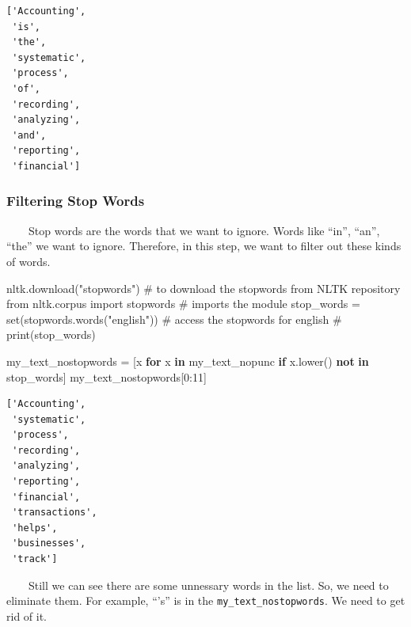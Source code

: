 \documentclass[
  letterpaper,
  DIV=11,
  numbers=noendperiod]{scrreprt}
\newenvironment{Shaded}{\begin{snugshade}}{\end{snugshade}}
\newcommand{\BuiltInTok}[1]{\textcolor[rgb]{0.00,0.23,0.31}{#1}}
\newcommand{\CommentTok}[1]{\textcolor[rgb]{0.37,0.37,0.37}{#1}}
\newcommand{\ControlFlowTok}[1]{\textcolor[rgb]{0.00,0.23,0.31}{\textbf{#1}}}
\newcommand{\DecValTok}[1]{\textcolor[rgb]{0.68,0.00,0.00}{#1}}
\newcommand{\ImportTok}[1]{\textcolor[rgb]{0.00,0.46,0.62}{#1}}
\newcommand{\KeywordTok}[1]{\textcolor[rgb]{0.00,0.23,0.31}{\textbf{#1}}}
\newcommand{\NormalTok}[1]{\textcolor[rgb]{0.00,0.23,0.31}{#1}}
\newcommand{\OperatorTok}[1]{\textcolor[rgb]{0.37,0.37,0.37}{#1}}
\newcommand{\StringTok}[1]{\textcolor[rgb]{0.13,0.47,0.30}{#1}}
\begin{document}
\begin{verbatim}
['Accounting',
 'is',
 'the',
 'systematic',
 'process',
 'of',
 'recording',
 'analyzing',
 'and',
 'reporting',
 'financial']
\end{verbatim}

\subsubsection{Filtering Stop Words}\label{filtering-stop-words}

~~~~Stop words are the words that we want to ignore. Words like ``in'',
``an'', ``the'' we want to ignore. Therefore, in this step, we want to
filter out these kinds of words.

\begin{Shaded}
\begin{Highlighting}[]
\NormalTok{nltk.download(}\StringTok{"stopwords"}\NormalTok{) }\CommentTok{\# to download the stopwords from NLTK repository}
\ImportTok{from}\NormalTok{ nltk.corpus }\ImportTok{import}\NormalTok{ stopwords }\CommentTok{\# imports the module }
\NormalTok{stop\_words }\OperatorTok{=} \BuiltInTok{set}\NormalTok{(stopwords.words(}\StringTok{"english"}\NormalTok{)) }\CommentTok{\# access the stopwords for english }
\CommentTok{\# print(stop\_words)}
\end{Highlighting}
\end{Shaded}

\begin{Shaded}
\begin{Highlighting}[]
\NormalTok{my\_text\_nostopwords }\OperatorTok{=}\NormalTok{ [x }\ControlFlowTok{for}\NormalTok{ x }\KeywordTok{in}\NormalTok{ my\_text\_nopunc }\ControlFlowTok{if}\NormalTok{ x.lower() }\KeywordTok{not} \KeywordTok{in}\NormalTok{ stop\_words]}
\NormalTok{my\_text\_nostopwords[}\DecValTok{0}\NormalTok{:}\DecValTok{11}\NormalTok{]}
\end{Highlighting}
\end{Shaded}

\begin{verbatim}
['Accounting',
 'systematic',
 'process',
 'recording',
 'analyzing',
 'reporting',
 'financial',
 'transactions',
 'helps',
 'businesses',
 'track']
\end{verbatim}

~~~~Still we can see there are some unnessary words in the list. So, we
need to eliminate them. For example, ``'s'' is in the
\texttt{my\_text\_nostopwords}. We need to get rid of it.
\end{document}
